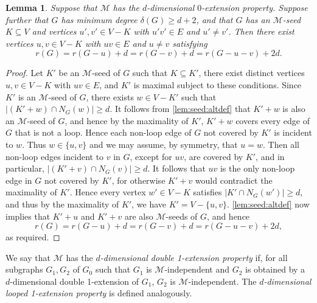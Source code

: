\documentclass[11pt,a4paper,dvipsnames]{scrartcl}
\newtheorem{lemma}[theorem]{Lemma}
\newcommand{\cM}{{\mathcal{M}}}
\begin{document}
\begin{lemma}\label{lemma:deletablevertices}
    Suppose that $\cM$ has the $d$-dimensional $0$-extension property. Suppose further that $G$ has minimum degree $\delta(G) \geq d+2$, and that $G$ has an $\cM$-seed $K \subseteq V$ and vertices $u',v' \in V-K$ with $u'v' \in E$ and $u' \neq v'$. Then there exist vertices $u,v \in V-K$ with $uv \in E$ and $u \neq v$ satisfying \[r(G) = r(G-u) + d = r(G-v)+d = r(G-u-v) + 2d.\]
\end{lemma}
\begin{proof}
    Let $K'$ be an $\cM$-seed of $G$ such that $K \subseteq K'$, there exist distinct vertices $u,v \in V-K$ with $uv \in E$, and $K'$ is maximal subject to these conditions. 
    Since $K'$ is an $\cM$-seed of $G$, there exists $w\in V-K'$ such that $|(K'+w)\cap N_G(w)|\geq d$. It follows from \cref{lem:seed:altdef} that $K' + w$ is also an $\cM$-seed of $G$, and hence by the maximality of $K'$, $K' + w$ covers every edge of $G$ that is not a loop. Hence each non-loop edge of $G$ not covered by $K'$ is incident to $w$. Thus $w\in \{u,v\}$ and we may assume, by symmetry, that $u=w$. Then all non-loop edges incident to $v$ in $G$, except for $uv$, are covered by $K'$, and in particular, $|(K'+v)\cap N_G(v)|\geq d$. It follows that $uv$ is the only non-loop edge in $G$ not covered by $K'$, for otherwise $K'+v$ would contradict the maximality of $K'$. Hence every vertex $w' \in V - K$ satisfies $|K' \cap N_G(w')| \geq d$, and thus by the maximality of $K'$, we have $K' = V - \{u,v\}$. \cref{lem:seed:altdef} now implies that $K'+u$ and $K'+v$ are also $\cM$-seeds of $G$, and hence \[r(G) = r(G-u) + d = r(G-v)+d = r(G-u-v) + 2d,\] as required.
\end{proof}

We say that $\cM$ has the {\em $d$-dimensional double 1-extension property} if, for all subgraphs $G_1,G_2$ of $G_0$ such that $G_1$ is $\cM$-independent and $G_2$ is obtained by a  $d$-dimensional double 1-extension of $G_1$, $G_2$ is $\cM$-independent. The {\em $d$-dimensional looped 1-extension property} is defined analogously.
\end{document}
